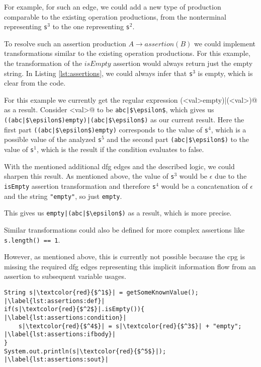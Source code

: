 For example, for such an edge, we could add a new type of production comparable to the existing operation productions, from the nonterminal representing \lstinline|s|$^3$ to the one representing \lstinline|s|$^2$.

To resolve such an assertion production $A \rightarrow assertion(B)$ we could implement transformations similar to the existing operation productions. For this example, the transformation of the $isEmpty$ assertion would always return just the empty string.
In Listing \ref{lst:assertions}, we could always infer that \lstinline|s|$^3$ is empty, which is clear from the code.

For this example we currently get the regular expression \Verb@(<val>empty)|(<val>)@ as a result. 
Consider \Verb@<val>@ to be \lstinline[mathescape]@abc|$\epsilon$@, which gives us \lstinline[mathescape]@((abc|$\epsilon$)empty)|(abc|$\epsilon$)@ as our current result.
Here the first part \lstinline[mathescape]@((abc|$\epsilon$)empty)@ corresponds to the value of \lstinline|s|$^4$, which is a possible value of the analyzed \lstinline|s|$^5$ and the second part \lstinline[mathescape]@(abc|$\epsilon$)@ to the value of \lstinline|s|$^1$, which is the result if the condition evaluates to false.

With the mentioned additional \ac{dfg} edges and the described logic, we could sharpen this result.
As mentioned above, the value of \lstinline|s|$^3$ would be $\epsilon$ due to the \lstinline|isEmpty| assertion transformation and therefore \lstinline|s|$^4$ would be a concatenation of $\epsilon$ and the string \lstinline|"empty"|, so just \lstinline|empty|.

This gives us \lstinline[mathescape]@empty|(abc|$\epsilon$)@ as a result, which is more precise.

Similar transformations could also be defined for more complex assertions like \lstinline|s.length() == 1|.

However, as mentioned above, this is currently not possible because the \ac{cpg} is missing the required \ac{dfg} edges representing this implicit information flow from an assertion to subsequent variable usages.

\begin{lstlisting}[caption={Assertion Example}, label=lst:assertions, captionpos=b, float, numbers=right, escapechar=|]
String s|\textcolor{red}{$^1$}| = getSomeKnownValue(); |\label{lst:assertions:def}|
if(s|\textcolor{red}{$^2$}|.isEmpty()){ |\label{lst:assertions:condition}|
	s|\textcolor{red}{$^4$}| = s|\textcolor{red}{$^3$}| + "empty"; |\label{lst:assertions:ifbody}|
}
System.out.println(s|\textcolor{red}{$^5$}|); |\label{lst:assertions:sout}|
\end{lstlisting}

